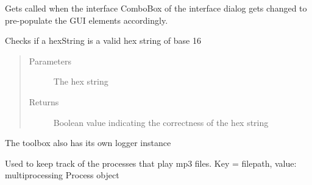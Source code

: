 \documentclass[letterpaper,10pt,english]{sphinxmanual}
\begin{document}
\begin{fulllineitems}
\begin{fulllineitems}
\label{\detokenize{src:src.Toolbox.Toolbox.interfaceSettingsDialogComboBoxChanged}}
Gets called when the interface ComboBox of the interface dialog gets changed to
pre-populate the GUI elements accordingly.

\end{fulllineitems}


\begin{fulllineitems}
\label{\detokenize{src:src.Toolbox.Toolbox.isHexString}}
Checks if a hexString is a valid hex string of base 16
\begin{quote}\begin{description}
\item[{Parameters}] \leavevmode
{} \textendash{} The hex string

\item[{Returns}] \leavevmode
Boolean value indicating the correctness of the hex string

\end{description}\end{quote}

\end{fulllineitems}


\begin{fulllineitems}
\label{\detokenize{src:src.Toolbox.Toolbox.logger}}
The toolbox also has its own logger instance

\end{fulllineitems}


\begin{fulllineitems}
\label{\detokenize{src:src.Toolbox.Toolbox.mp3Processes}}
Used to keep track of the processes that play mp3 files.
Key = filepath, value: multiprocessing Process object

\end{fulllineitems}


\end{fulllineitems}
\end{document}
